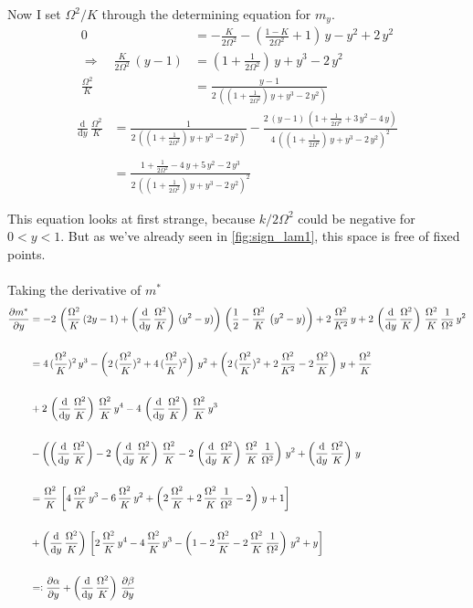 \documentclass{article}
\begin{document}
Now I set $\Omega^2/K$ through the determining equation for $m_y$.
\begin{align*}
    0&=-\frac{K}{2\Omega^2}-\left( \frac{1-K}{2\Omega^2} +1\right)\,{y}-{y}^2+2\,{y}^2\\
    \Rightarrow\quad \frac{K}{2\Omega^2}\,({y}-1)&=(1+\frac{1}{2\Omega^2})\,{y}+{y}^3-2\,{y}^2\\
    \frac{\Omega^2}{K}&=\frac{{y}-1}{2\,\left(  (1+\frac{1}{2\Omega^2})\,{y}+{y}^3-2\,{y}^2\right)}
\end{align*}
\begin{align*}
    \frac{\text{d}}{\text{d}{y}}\,\frac{\Omega^2}{K}&=\frac{1}{2\,\left(  (1+\frac{1}{2\Omega^2})\,{y}+{y}^3-2\,{y}^2\right)}-\frac{2\,({y}-1)\,(1+\frac{1}{2\Omega^2}+3\,{y}^2-4\,{y})}{4\,\left(  (1+\frac{1}{2\Omega^2})\,{y}+{y}^3-2\,{y}^2\right)^2}\\\\
    &=\frac{1+\frac{1}{2\Omega^2}-4\,{y}+5\,{y}^2-2\,{y}^3}{2\,\left(  (1+\frac{1}{2\Omega^2})\,{y}+{y}^3-2\,{y}^2\right)^2}
\end{align*}

This equation looks at first strange, because $k/2\Omega^2$ could be negative for $0<{y}<1$. But as we've already seen in \autoref{fig:sign_lam1}, this space is free of fixed points. \\\\
Taking the derivative of $m^*$
\begin{align*}
    \frac{\partial m^*}{\partial{y}}&=-2\,\left(\frac{\Omega^2}{K}\,(2{y}-1)+\left(\frac{\text{d}}{\text{d}{y}}\,\frac{\Omega^2}{K}\right)\,({y}^2-{y})\right)\,\left( \frac{1}{2}-\frac{\Omega^2}{K}\,\left( {y}^2- {y} \right) \right)+2\,\frac{\Omega^2}{K^2}\,{y}+2\,\left(\frac{\text{d}}{\text{d}{y}}\,\frac{\Omega^2}{K}\right)\,\frac{\Omega^2}{K}\,\frac{1}{\Omega^2}\,{y}^2\\\\
    &=4\,(\frac{\Omega^2}{K})^2\,{y}^3-\left(2\,(\frac{\Omega^2}{K})^2+4\,(\frac{\Omega^2}{K})^2\right)\,{y}^2+\left( 2\,(\frac{\Omega^2}{K})^2+2\,\frac{\Omega^2}{K^2}-2\,\frac{\Omega^2}{K} \right)\,{y}+\frac{\Omega^2}{K}\\\\
    &+2\,\left(\frac{\text{d}}{\text{d}{y}}\,\frac{\Omega^2}{K}\right)\,\frac{\Omega^2}{K}\,{y}^4-4\,\left(\frac{\text{d}}{\text{d}{y}}\,\frac{\Omega^2}{K}\right)\,\frac{\Omega^2}{K}\,{y}^3\\\\
    &-\left(\left(\frac{\text{d}}{\text{d}{y}}\,\frac{\Omega^2}{K}\right)-2\,\left(\frac{\text{d}}{\text{d}{y}}\,\frac{\Omega^2}{K}\right)\,\frac{\Omega^2}{K}-2\,\left(\frac{\text{d}}{\text{d}{y}}\,\frac{\Omega^2}{K}\right)\,\frac{\Omega^2}{K}\,\frac{1}{\Omega^2}\right)\,{y}^2+\left(\frac{\text{d}}{\text{d}{y}}\,\frac{\Omega^2}{K}\right)\,{y}\\\\
    &=\frac{\Omega^2}{K}\,\left[  4\,\frac{\Omega^2}{K}\,{y}^3-6\,\frac{\Omega^2}{K}\,{y}^2+\left( 2\,\frac{\Omega^2}{K}+2\,\frac{\Omega^2}{K}\,\frac{1}{\Omega^2}-2 \right)\,{y}+1 \right]\\\\
    &+\left(\frac{\text{d}}{\text{d}{y}}\,\frac{\Omega^2}{K}\right)\,\left[2\,\frac{\Omega^2}{K}\,{y}^4-4\,\frac{\Omega^2}{K}\,{y}^3-\left(1-2\,\frac{\Omega^2}{K}-2\,\frac{\Omega^2}{K}\,\frac{1}{\Omega^2}\right)\,{y}^2+{y}\right]\\\\
    &=\vcentcolon \frac{\partial \alpha}{\partial{y}}+\left(\frac{\text{d}}{\text{d}{y}}\,\frac{\Omega^2}{K}\right)\,\frac{\partial \beta}{\partial{y}}
\end{align*}
\end{document}
